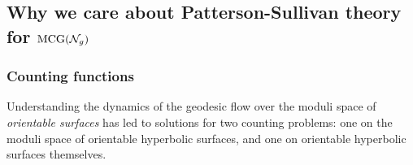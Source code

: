 

\subsection*{Why we care about Patterson-Sullivan theory for $\mathrm{MCG}(\mathcal{N}_g)$}

\subsubsection*{Counting functions}

Understanding the dynamics of the geodesic flow over the moduli space of \emph{orientable surfaces} has led to solutions for two counting problems: one on the moduli space of orientable hyperbolic surfaces, and one on orientable hyperbolic surfaces themselves.

